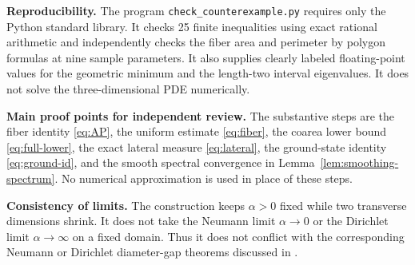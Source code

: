 \documentclass[11pt,a4paper]{article}
\theoremstyle{remark}
\begin{document}
\textbf{Reproducibility.} The program \texttt{check\_counterexample.py} requires only the Python standard library. It checks 25 finite inequalities using exact rational arithmetic and independently checks the fiber area and perimeter by polygon formulas at nine sample parameters. It also supplies clearly labeled floating-point values for the geometric minimum and the length-two interval eigenvalues. It does not solve the three-dimensional PDE numerically.

\textbf{Main proof points for independent review.} The substantive steps are the fiber identity \eqref{eq:AP}, the uniform estimate \eqref{eq:fiber}, the coarea lower bound \eqref{eq:full-lower}, the exact lateral measure \eqref{eq:lateral}, the ground-state identity \eqref{eq:ground-id}, and the smooth spectral convergence in Lemma~\ref{lem:smoothing-spectrum}. No numerical approximation is used in place of these steps.

\textbf{Consistency of limits.} The construction keeps $\alpha>0$ fixed while two transverse dimensions shrink. It does not take the Neumann limit $\alpha\to0$ or the Dirichlet limit $\alpha\to\infty$ on a fixed domain. Thus it does not conflict with the corresponding Neumann or Dirichlet diameter-gap theorems discussed in \cite{laugesen}.
\end{document}

